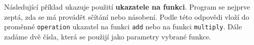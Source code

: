 \begin{mdframed}[style=mdexam]
  \begin{example}\label{cpp:exam011}
    Následující příklad ukazuje použití \textbf{ukazatele na funkci}. Program se nejprve zeptá, zda
    se má provádět sčítání nebo násobení. Podle této odpovědi vloží do proměnné \texttt{operation}
    ukazatel na funkci \texttt{add} nebo na funkci \texttt{multiply}. Dále zadáme dvě čísla, která
    se použijí jako parametry vybrané funkce.
    
\end{example}
\end{mdframed}